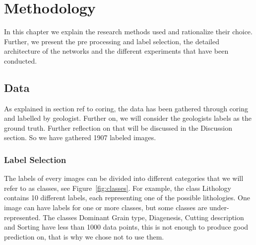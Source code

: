 \chapter{Methodology}\label{chp:methodology}
In this chapter we explain the research methods used and rationalize their choice. Further, we present the pre processing and label selection, the detailed architecture of the networks and the different experiments that have been conducted. 
\section{Data}

As explained in section ref to coring, the data has been gathered through coring and labelled by geologist. Further on, we will consider the geologists labels as the ground truth. Further reflection on that will be discussed in the Discussion section. So we have gathered 1907 labeled images. 
\subsection{Label Selection}
 The labels of every images can be divided into different categories that we will refer to as classes, see Figure~\ref{fig:classes}. For example, the class Lithology contains 10 different labels, each representing one of the possible lithologies. One image can have labels for one or more classes, but some classes are under-represented. The classes Dominant Grain type, Diagenesis, Cutting description and Sorting have less than 1000 data points, this is not enough to produce good prediction on, that is why we chose not to use them.
 
